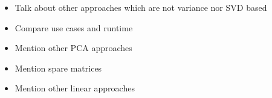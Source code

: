 \begin{itemize}
	\item Talk about other approaches which are not variance nor SVD based
	\item Compare use cases and runtime
	\item Mention other PCA approaches
	\item Mention spare matrices
	\item Mention other linear approaches
\end{itemize}


\clearpage

